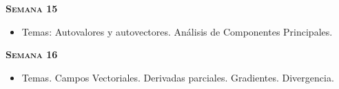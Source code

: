 \documentclass[letterpaper,10pt,onecolumn]{article}
\begin{document}
\noindent\textbf{\textsc{Semana 15}}\\[-0.5cm]
\begin{itemize}
\item Temas: Autovalores y autovectores. 
An\'alisis de Componentes Principales. \\[-0.6cm]
\end{itemize}

\noindent\textbf{\textsc{Semana 16}}\\[-0.5cm]
\begin{itemize}
\item Temas. Campos Vectoriales. Derivadas parciales. Gradientes. Divergencia.\\[-0.6cm]  
\end{itemize}




\end{document}
